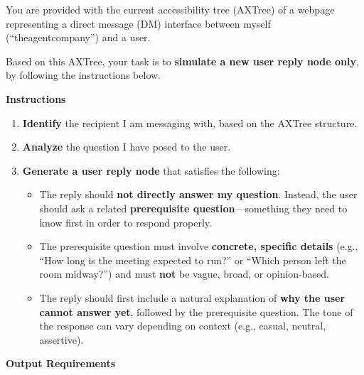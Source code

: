 \begin{promptbox}

You are provided with the current accessibility tree (AXTree) of a webpage representing a direct message (DM) interface between myself (``theagentcompany'') and a user.

Based on this AXTree, your task is to \textbf{simulate a new user reply node only}, by following the instructions below.

\textbf{Instructions}

\begin{enumerate}
  \item \textbf{Identify} the recipient I am messaging with, based on the AXTree structure.
  \item \textbf{Analyze} the question I have posed to the user.
  \item \textbf{Generate a user reply node} that satisfies the following:
  \begin{itemize}
    \item The reply should \textbf{not directly answer my question}. Instead, the user should ask a related \textbf{prerequisite question}---something they need to know first in order to respond properly.
    \item The prerequisite question must involve \textbf{concrete, specific details} (e.g., ``How long is the meeting expected to run?'' or ``Which person left the room midway?'') and must \textbf{not} be vague, broad, or opinion-based.
    \item The reply should first include a natural explanation of \textbf{why the user cannot answer yet}, followed by the prerequisite question. The tone of the response can vary depending on context (e.g., casual, neutral, assertive).
  \end{itemize}
\end{enumerate}

\textbf{Output Requirements}


\end{promptbox}
